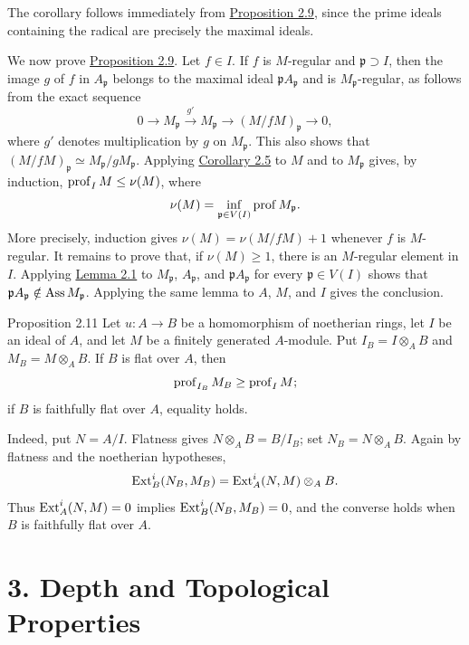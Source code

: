 The corollary follows immediately from \hyperref[III.2.9]{Proposition 2.9}, since the prime
ideals containing the radical are precisely the maximal ideals.

We now prove \hyperref[III.2.9]{Proposition 2.9}. Let $f\in I$. If $f$ is $M$-regular and
$\mathfrak p\supset I$, then the image $g$ of $f$ in $A_{\mathfrak p}$
belongs to the maximal ideal $\mathfrak pA_{\mathfrak p}$ and is
$M_{\mathfrak p}$-regular, as follows from the exact sequence
\begin{equation}\label{eq:III.2.3}
  0\longrightarrow M_{\mathfrak p}\xrightarrow{g'}M_{\mathfrak p}
  \longrightarrow(M/fM)_{\mathfrak p}\longrightarrow0,
\end{equation}
where $g'$ denotes multiplication by $g$ on $M_{\mathfrak p}$. This also
shows that $(M/fM)_{\mathfrak p}\simeq M_{\mathfrak p}/gM_{\mathfrak p}$.
Applying \hyperref[III.2.5]{Corollary 2.5} to $M$ and to $M_{\mathfrak p}$ gives, by induction,
$\operatorname{prof}_I M\le\nu(M)$, where
\[
  \nu(M)=\inf_{\mathfrak p\in V(I)}\operatorname{prof} M_{\mathfrak p}.
\]
More precisely, induction gives $\nu(M)=\nu(M/fM)+1$ whenever $f$ is
$M$-regular. It remains to prove that, if $\nu(M)\ge1$, there is an
$M$-regular element in $I$. Applying \hyperref[III.2.1]{Lemma 2.1} to
$M_{\mathfrak p}$, $A_{\mathfrak p}$, and
$\mathfrak pA_{\mathfrak p}$ for every $\mathfrak p\in V(I)$ shows that
$\mathfrak pA_{\mathfrak p}\notin\operatorname{Ass} M_{\mathfrak p}$. Applying the
same lemma to $A$, $M$, and $I$ gives the conclusion.

\begin{sgastatement}{Proposition 2.11}
Let $u:A\to B$ be a homomorphism of noetherian rings, let $I$ be an ideal
of $A$, and let $M$ be a finitely generated $A$-module. Put
$I_B=I\otimes_A B$ and $M_B=M\otimes_A B$. If $B$ is flat over $A$, then
\[
  \operatorname{prof}_{I_B}M_B\ge\operatorname{prof}_I M;
\]
if $B$ is faithfully flat over $A$, equality holds.
\end{sgastatement}

Indeed, put $N=A/I$. Flatness gives $N\otimes_A B=B/I_B$; set
$N_B=N\otimes_A B$. Again by flatness and the noetherian hypotheses,
\[
  \operatorname{Ext}_B^i(N_B,M_B)=\operatorname{Ext}_A^i(N,M)\otimes_A B.
\]
Thus $\operatorname{Ext}_A^i(N,M)=0$ implies $\operatorname{Ext}_B^i(N_B,M_B)=0$, and the converse
holds when $B$ is faithfully flat over $A$.



\section*{3. Depth and Topological Properties}

